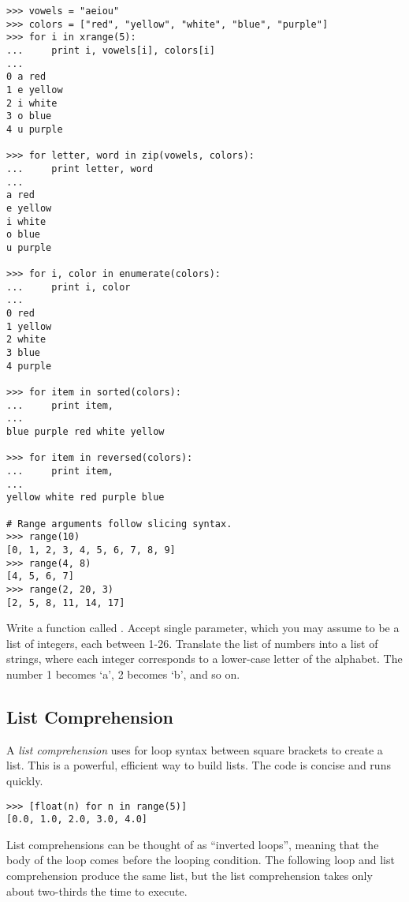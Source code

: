 
\begin{lstlisting}
>>> vowels = "aeiou"
>>> colors = ["red", "yellow", "white", "blue", "purple"]
>>> for i in xrange(5):
...     print i, vowels[i], colors[i]
... 
0 a red
1 e yellow
2 i white
3 o blue
4 u purple

>>> for letter, word in zip(vowels, colors):
...     print letter, word
... 
a red
e yellow
i white
o blue
u purple

>>> for i, color in enumerate(colors):
...     print i, color
... 
0 red
1 yellow
2 white
3 blue
4 purple

>>> for item in sorted(colors):
...     print item,
...
blue purple red white yellow

>>> for item in reversed(colors):
...     print item,
...
yellow white red purple blue

# Range arguments follow slicing syntax.
>>> range(10)
[0, 1, 2, 3, 4, 5, 6, 7, 8, 9]
>>> range(4, 8)
[4, 5, 6, 7]
>>> range(2, 20, 3)
[2, 5, 8, 11, 14, 17]
\end{lstlisting}

\begin{problem}
Write a function called .
Accept single parameter, which you may assume to be a list of integers, each between 1-26.
Translate the list of numbers into a list of strings, where each integer corresponds to a lower-case letter of the alphabet.
The number 1 becomes `a', 2 becomes `b', and so on.
\end{problem}


\subsection*{List Comprehension}
A \emph{list comprehension} uses for loop syntax between square brackets to create a list.
This is a powerful, efficient way to build lists.
The code is concise and runs quickly.

\begin{lstlisting}
>>> [float(n) for n in range(5)]
[0.0, 1.0, 2.0, 3.0, 4.0]
\end{lstlisting}

List comprehensions can be thought of as ``inverted loops'', meaning that the body of the loop comes before the looping condition.
The following loop and list comprehension produce the same list, but the list comprehension takes only about two-thirds the time to execute.

